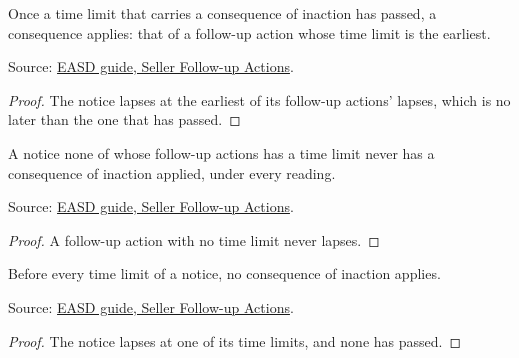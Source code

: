 \begin{theorem}
  \label{thm:airline-change-earliest-limit}
  Once a time limit that carries a consequence of inaction has passed, a
  consequence applies: that of a follow-up action whose time limit is the
  earliest.

  Source: \href{https://standards.atlassian.net/wiki/spaces/EASD/pages/574849094}{EASD guide, Seller Follow-up Actions}.
\end{theorem}
\begin{proof}
  The notice lapses at the earliest of its follow-up actions' lapses, which
  is no later than the one that has passed.
\end{proof}

\begin{theorem}
  \label{thm:airline-change-no-limit}
  A notice none of whose follow-up actions has a time limit never has a
  consequence of inaction applied, under every reading.

  Source: \href{https://standards.atlassian.net/wiki/spaces/EASD/pages/574849094}{EASD guide, Seller Follow-up Actions}.
\end{theorem}
\begin{proof}
  A follow-up action with no time limit never lapses.
\end{proof}

\begin{theorem}
  \label{thm:airline-change-before-limits}
  Before every time limit of a notice, no consequence of inaction applies.

  Source: \href{https://standards.atlassian.net/wiki/spaces/EASD/pages/574849094}{EASD guide, Seller Follow-up Actions}.
\end{theorem}
\begin{proof}
  The notice lapses at one of its time limits, and none has passed.
\end{proof}

